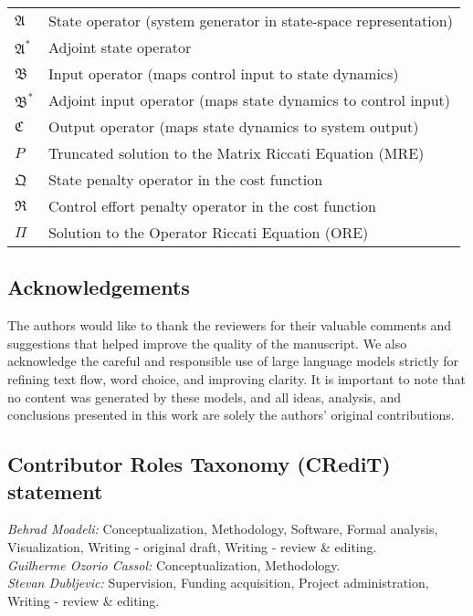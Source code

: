 \begin{table}[ht]
\begin{tabular}{ll}
$\mathfrak{A}$ & State operator (system generator in state-space representation) \\
$\mathfrak{A}^*$ & Adjoint state operator \\
$\mathfrak{B}$ & Input operator (maps control input to state dynamics) \\
$\mathfrak{B}^*$ & Adjoint input operator (maps state dynamics to control input) \\
$\mathfrak{C}$ & Output operator (maps state dynamics to system output) \\
$P$ & Truncated solution to the Matrix Riccati Equation (MRE) \\
$\mathfrak{Q}$ & State penalty operator in the cost function \\
$\mathfrak{R}$ & Control effort penalty operator in the cost function \\
$\Pi$ & Solution to the Operator Riccati Equation (ORE) \\
\bottomrule
\end{tabular}
\label{tab:nomenclature}
\end{table}


\newpage
\subsection*{Acknowledgements}
\label{sec:ack}

The authors would like to thank the reviewers for their valuable comments and suggestions that helped improve the quality of the manuscript. We also acknowledge the careful and responsible use of large language models strictly for refining text flow, word choice, and improving clarity. It is important to note that no content was generated by these models, and all ideas, analysis, and conclusions presented in this work are solely the authors’ original contributions.

\subsection*{Contributor Roles Taxonomy (CRediT) statement}

\textit{Behrad Moadeli:} Conceptualization, Methodology, Software, Formal analysis, Visualization, Writing - original draft, Writing - review \& editing.\\
\textit{Guilherme Ozorio Cassol:} Conceptualization, Methodology.\\
\textit{Stevan Dubljevic:} Supervision, Funding acquisition, Project administration, Writing - review \& editing.